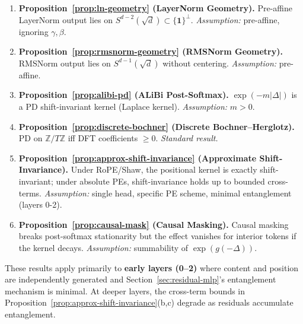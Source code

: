 \documentclass[11pt]{article}
\theoremstyle{definition}
\begin{document}
\begin{enumerate}
    \item \textbf{Proposition~\ref{prop:ln-geometry} (LayerNorm Geometry).} Pre-affine LayerNorm output lies on $S^{d-2}(\sqrt{d}) \subset \{\mathbf{1}\}^\perp$. \emph{Assumption:} pre-affine, ignoring $\gamma, \beta$.
    \item \textbf{Proposition~\ref{prop:rmsnorm-geometry} (RMSNorm Geometry).} RMSNorm output lies on $S^{d-1}(\sqrt{d})$ without centering. \emph{Assumption:} pre-affine.
    \item \textbf{Proposition~\ref{prop:alibi-pd} (ALiBi Post-Softmax).} $\exp(-m|\Delta|)$ is a PD shift-invariant kernel (Laplace kernel). \emph{Assumption:} $m > 0$.
    \item \textbf{Proposition~\ref{prop:discrete-bochner} (Discrete Bochner--Herglotz).} PD on $\mathbb{Z}/T\mathbb{Z}$ iff DFT coefficients $\geq 0$. \emph{Standard result.}
    \item \textbf{Proposition~\ref{prop:approx-shift-invariance} (Approximate Shift-Invariance).} Under RoPE/Shaw, the positional kernel is exactly shift-invariant; under absolute PEs, shift-invariance holds up to bounded cross-terms. \emph{Assumption:} single head, specific PE scheme, minimal entanglement (layers 0-2).
    \item \textbf{Proposition~\ref{prop:causal-mask} (Causal Masking).} Causal masking breaks post-softmax stationarity but the effect vanishes for interior tokens if the kernel decays. \emph{Assumption:} summability of $\exp(g(-\Delta))$.
\end{enumerate}

These results apply primarily to \textbf{early layers (0--2)} where content and position are independently generated and Section~\ref{sec:residual-mlp}'s entanglement mechanism is minimal. At deeper layers, the cross-term bounds in Proposition~\ref{prop:approx-shift-invariance}(b,c) degrade as residuals accumulate entanglement.
\end{document}
